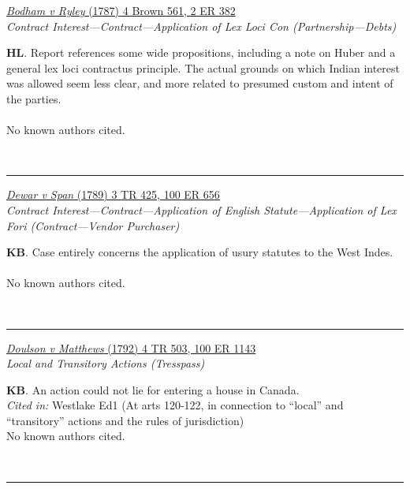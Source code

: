 \documentclass[twoside]{article}
\begin{document}
        \begin{small}
        \begin{center}
        \href{https://heinonline.org/HOL/P?h=hein.engrep/engra0002&i=390}{\textit{Bodham v Ryley} (1787) 4 Brown 561, 2 ER 382} \label{21} \\ 
\textit{Contract Interest---Contract---Application of Lex Loci Con (Partnership---Debts)}\\
        \end{center}
        \textbf{HL}. Report references some wide propositions, including a note on Huber and a general lex loci contractus principle. The actual grounds on which Indian interest was allowed seem less clear, and more related to presumed custom and intent of the parties.\\\\No known authors cited.
        \end{small}\\
        \rule{\textwidth}{0.5pt}
        

        \begin{small}
        \begin{center}
        \href{https://heinonline.org/HOL/P?h=hein.engrep/engrf0100&i=660}{\textit{Dewar v Span} (1789) 3 TR 425, 100 ER 656} \label{26} \\ 
\textit{Contract Interest---Contract---Application of English Statute---Application of Lex Fori (Contract---Vendor Purchaser)}\\
        \end{center}
        \textbf{KB}. Case entirely concerns the application of usury statutes to the West Indes.\\\\No known authors cited.
        \end{small}\\
        \rule{\textwidth}{0.5pt}
        

        \begin{small}
        \begin{center}
        \href{https://heinonline.org/HOL/P?h=hein.engrep/engrf0100&i=1147}{\textit{Doulson v Matthews} (1792) 4 TR 503, 100 ER 1143} \label{13} \\ 
\textit{Local and Transitory Actions (Tresspass)}\\
        \end{center}
        \textbf{KB}. An action could not lie for entering a house in Canada.\\\textit{Cited in: }Westlake Ed1 (At arts 120-122, in connection to “local” and “transitory” actions and the rules of jurisdiction)\\No known authors cited.
        \end{small}\\
        \rule{\textwidth}{0.5pt}
        
\end{document}
